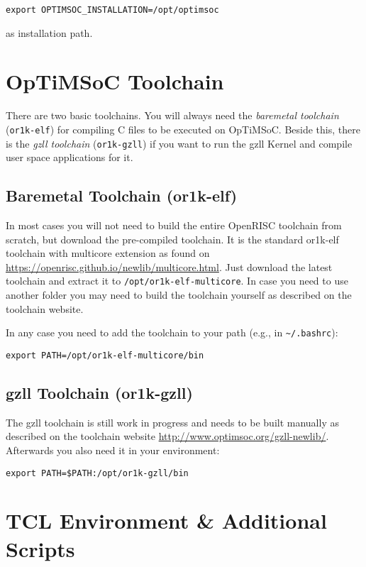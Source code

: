 \begin{lstlisting}
export OPTIMSOC_INSTALLATION=/opt/optimsoc
\end{lstlisting}

as installation path.

\section{OpTiMSoC Toolchain}

There are two basic toolchains. You will always need the
\emph{baremetal toolchain} (\verb|or1k-elf|) for compiling C files to
be executed on OpTiMSoC. Beside this, there is the \emph{gzll
  toolchain} (\verb|or1k-gzll|) if you want to run the gzll Kernel and
compile user space applications for it.

\subsection{Baremetal Toolchain (or1k-elf)}

In most cases you will not need to build the entire OpenRISC toolchain
from scratch, but download the pre-compiled toolchain. It is the
standard or1k-elf toolchain with multicore extension as found on
\url{https://openrisc.github.io/newlib/multicore.html}. Just download
the latest toolchain and extract it to
\verb|/opt/or1k-elf-multicore|. In case you need to use another folder
you may need to build the toolchain yourself as described on the
toolchain website.

In any case you need to add the toolchain to your path (e.g., in
\verb|~/.bashrc|):

\begin{lstlisting}
export PATH=/opt/or1k-elf-multicore/bin
\end{lstlisting}

\subsection{gzll Toolchain (or1k-gzll)}

The gzll toolchain is still work in progress and needs to be built
manually as described on the toolchain website
\url{http://www.optimsoc.org/gzll-newlib/}. Afterwards you also need
it in your environment:

\begin{lstlisting}
export PATH=$PATH:/opt/or1k-gzll/bin
\end{lstlisting}

\section{TCL Environment \& Additional Scripts}

